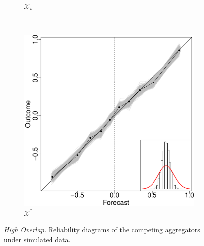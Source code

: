 \documentclass[11pt]{article}
\theoremstyle{definition}
\theoremstyle{definition}
\begin{document}
\begin{figure}[t!]
\begin{subfigure}[b]{0.323\textwidth}
                \caption{$\mathcal{X}_w$}
        \label{RelOWAHigh}
        \end{subfigure}
        ~ %
        \begin{subfigure}[b]{0.323\textwidth}
                \includegraphics[width=\textwidth]{SimDepELOP}
                \caption{$\mathcal{X}^*$ }
        \label{RelEOWAHigh}
        \end{subfigure}
   \caption{\textit{High Overlap.} Reliability diagrams of the competing aggregators under simulated data. 
    }        
   \label{HighOverlap}
\end{figure}
\end{document}
